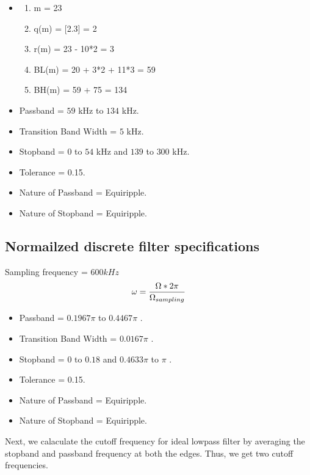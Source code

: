 \documentclass{article}
\begin{document}
\begin{itemize}
    \item \begin{enumerate}
                \item m = 23
                \item q(m) = [2.3] = 2
                \item r(m) = 23 - 10*2 = 3
                \item BL(m) = 20 + 3*2 + 11*3 = 59
                \item BH(m) = 59 + 75 = 134
            \end{enumerate}

    \item Passband = $59$ kHz to $134$ kHz.
    \item Transition Band Width = $5$ kHz.
    \item Stopband = $0$ to $54$ kHz and $139$ to $300$ kHz.
    \item Tolerance = 0.15.
    \item Nature of Passband = Equiripple.
    \item Nature of Stopband = Equiripple.
\end{itemize}


\subsection{Normailzed discrete filter specifications}
Sampling frequency = $600 kHz$\\
\begin{equation}
    \omega = \frac{\Omega * 2\pi}{\Omega _{sampling}}\\
\end{equation}

\begin{itemize}
    \item Passband = $0.1967\pi$ to $0.4467\pi$ .
    \item Transition Band Width = $0.0167\pi$ .
    \item Stopband = $0$ to $0.18$  and $0.4633\pi$ to $\pi$ .
    \item Tolerance = 0.15.
    \item Nature of Passband = Equiripple.
    \item Nature of Stopband = Equiripple.
\end{itemize}

Next, we calaculate the cutoff frequency for ideal lowpass filter by averaging the stopband and passband frequency at both the edges. Thus, we get two cutoff frequencies.
\end{document}
